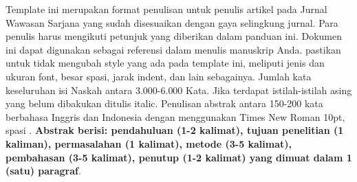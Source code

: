 \documentclass{jurnalft}
\begin{document}
	
	\cetakHeader
	\cetakDaftarPenulis
	
	\begin{abstrak}
		Template ini merupakan format penulisan untuk penulis artikel pada Jurnal Wawasan Sarjana yang sudah disesuaikan dengan gaya selingkung jurnal. Para penulis harus mengikuti petunjuk yang diberikan dalam panduan ini. Dokumen ini dapat digunakan sebagai referensi dalam menulis manuskrip Anda. pastikan untuk tidak mengubah style yang ada pada template ini, meliputi jenis dan ukuran font, besar spasi, jarak indent, dan lain sebagainya. Jumlah kata keseluruhan isi Naskah antara 3.000-6.000 Kata. Jika terdapat istilah-istilah asing yang belum dibakukan ditulis italic. Penulisan abstrak antara 150-200 kata berbahasa Inggris dan Indonesia dengan menggunakan Times New Roman 10pt, spasi . \textbf{Abstrak berisi: pendahuluan (1-2 kalimat), tujuan penelitian (1 kaliman), permasalahan (1 kalimat), metode (3-5 kalimat), pembahasan (3-5 kalimat), penutup (1-2 kalimat) yang dimuat dalam 1 (satu) paragraf}.
	\end{abstrak}
	
\end{document}
